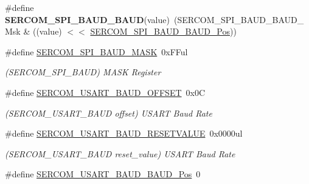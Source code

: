 \begin{DoxyCompactItemize}
\item 
\hypertarget{group___s_a_m_l21___s_e_r_c_o_m_ga00be457ee6376a75e063c6261a87feb0}{}\#define {\bfseries S\+E\+R\+C\+O\+M\+\_\+\+S\+P\+I\+\_\+\+B\+A\+U\+D\+\_\+\+B\+A\+U\+D}(value)~(S\+E\+R\+C\+O\+M\+\_\+\+S\+P\+I\+\_\+\+B\+A\+U\+D\+\_\+\+B\+A\+U\+D\+\_\+\+Msk \& ((value) $<$$<$ \hyperlink{group___s_a_m_l21___s_e_r_c_o_m_gab3954fea9c2f190a4322171bde60f5ce}{S\+E\+R\+C\+O\+M\+\_\+\+S\+P\+I\+\_\+\+B\+A\+U\+D\+\_\+\+B\+A\+U\+D\+\_\+\+Pos}))\label{group___s_a_m_l21___s_e_r_c_o_m_ga00be457ee6376a75e063c6261a87feb0}

\item 
\hypertarget{group___s_a_m_l21___s_e_r_c_o_m_gafb27ce59d7ed44dc824783ed55f78995}{}\#define \hyperlink{group___s_a_m_l21___s_e_r_c_o_m_gafb27ce59d7ed44dc824783ed55f78995}{S\+E\+R\+C\+O\+M\+\_\+\+S\+P\+I\+\_\+\+B\+A\+U\+D\+\_\+\+M\+A\+S\+K}~0x\+F\+Ful\label{group___s_a_m_l21___s_e_r_c_o_m_gafb27ce59d7ed44dc824783ed55f78995}

\begin{DoxyCompactList}\small\item\em (S\+E\+R\+C\+O\+M\+\_\+\+S\+P\+I\+\_\+\+B\+A\+U\+D) M\+A\+S\+K Register \end{DoxyCompactList}\item 
\hypertarget{group___s_a_m_l21___s_e_r_c_o_m_gabade7303cd6470d302ba71d73288a415}{}\#define \hyperlink{group___s_a_m_l21___s_e_r_c_o_m_gabade7303cd6470d302ba71d73288a415}{S\+E\+R\+C\+O\+M\+\_\+\+U\+S\+A\+R\+T\+\_\+\+B\+A\+U\+D\+\_\+\+O\+F\+F\+S\+E\+T}~0x0\+C\label{group___s_a_m_l21___s_e_r_c_o_m_gabade7303cd6470d302ba71d73288a415}

\begin{DoxyCompactList}\small\item\em (S\+E\+R\+C\+O\+M\+\_\+\+U\+S\+A\+R\+T\+\_\+\+B\+A\+U\+D offset) U\+S\+A\+R\+T Baud Rate \end{DoxyCompactList}\item 
\hypertarget{group___s_a_m_l21___s_e_r_c_o_m_ga32db38dfe30d53edfe602018b158d9ce}{}\#define \hyperlink{group___s_a_m_l21___s_e_r_c_o_m_ga32db38dfe30d53edfe602018b158d9ce}{S\+E\+R\+C\+O\+M\+\_\+\+U\+S\+A\+R\+T\+\_\+\+B\+A\+U\+D\+\_\+\+R\+E\+S\+E\+T\+V\+A\+L\+U\+E}~0x0000ul\label{group___s_a_m_l21___s_e_r_c_o_m_ga32db38dfe30d53edfe602018b158d9ce}

\begin{DoxyCompactList}\small\item\em (S\+E\+R\+C\+O\+M\+\_\+\+U\+S\+A\+R\+T\+\_\+\+B\+A\+U\+D reset\+\_\+value) U\+S\+A\+R\+T Baud Rate \end{DoxyCompactList}\item 
\hypertarget{group___s_a_m_l21___s_e_r_c_o_m_ga1def645e5960fea081f9adc3c252e8e4}{}\#define \hyperlink{group___s_a_m_l21___s_e_r_c_o_m_ga1def645e5960fea081f9adc3c252e8e4}{S\+E\+R\+C\+O\+M\+\_\+\+U\+S\+A\+R\+T\+\_\+\+B\+A\+U\+D\+\_\+\+B\+A\+U\+D\+\_\+\+Pos}~0\label{group___s_a_m_l21___s_e_r_c_o_m_ga1def645e5960fea081f9adc3c252e8e4}


\end{DoxyCompactItemize}
